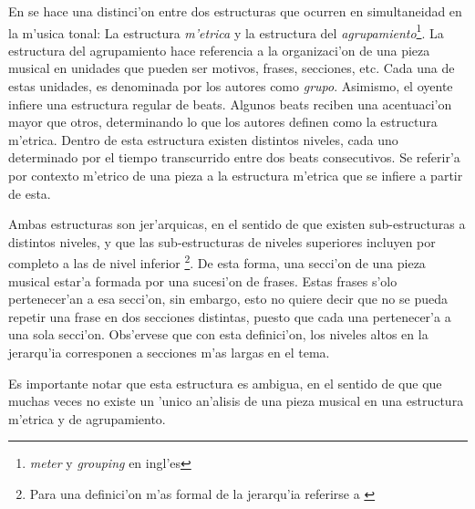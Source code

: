 En \citet*{LerdahlJackendoff83} se hace una distinci'on entre dos estructuras que ocurren en simultaneidad en la m'usica tonal:
La estructura \emph{m'etrica} y la estructura del \emph{agrupamiento}\footnote{\emph{meter} y \emph{grouping} en ingl'es}. 
La estructura del agrupamiento hace referencia a la organizaci'on de una pieza musical en unidades que pueden ser motivos, frases, secciones, etc. 
Cada una de estas unidades, es denominada por los autores como \emph{grupo}. Asimismo, el oyente infiere una estructura regular de beats. 
Algunos beats reciben una acentuaci'on mayor que otros, determinando lo que los autores definen como la estructura m'etrica. Dentro de esta estructura
existen distintos niveles, cada uno determinado por el tiempo transcurrido entre dos beats consecutivos. 
Se referir'a por contexto m'etrico de una pieza a la estructura m'etrica que se infiere a partir de esta.

Ambas estructuras son jer'arquicas, en el sentido de que existen sub-estructuras a distintos niveles, y que las sub-estructuras de niveles superiores 
incluyen por completo a las de nivel inferior
\footnote{Para una definici'on m'as formal de la jerarqu'ia referirse a \citet[cap. ~2]{LerdahlJackendoff83}}. De esta forma, una secci'on
de una pieza musical estar'a formada por una sucesi'on de frases. Estas frases s'olo pertenecer'an a esa secci'on, sin embargo, esto no quiere decir
que no se pueda repetir una frase en dos secciones distintas, puesto que cada una pertenecer'a a una sola secci'on. Obs'ervese que con esta definici'on,
los niveles altos en la jerarqu'ia corresponen a secciones m'as largas en el tema.

%
%
%
Es importante notar que esta estructura es ambigua, en el sentido de que que muchas veces no existe un 'unico an'alisis de una pieza musical 
en una estructura m'etrica y de agrupamiento.


